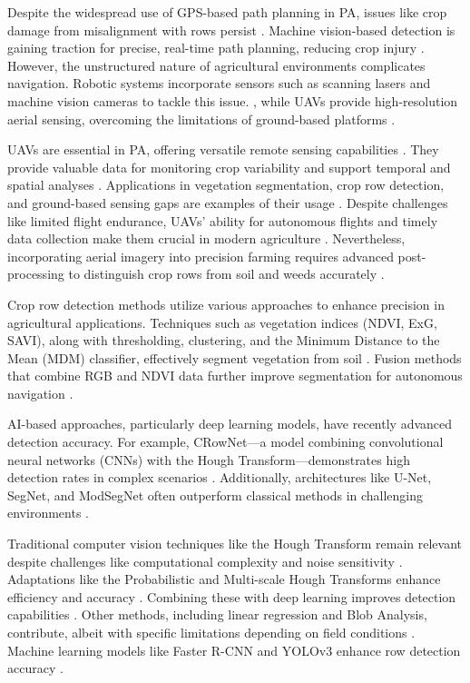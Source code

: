 \documentclass[conference]{IEEEtran}
\begin{document}
	Despite the widespread use of GPS-based path planning in PA, issues like crop damage from misalignment with rows persist \cite{b1}. Machine vision-based detection is gaining traction for precise, real-time path planning, reducing crop injury \cite{b1,b8}. However, the unstructured nature of agricultural environments complicates navigation. Robotic systems incorporate sensors such as scanning lasers and machine vision cameras to tackle this issue. \cite{b2,b3}, while UAVs provide high-resolution aerial sensing, overcoming the limitations of ground-based platforms \cite{b10}.
	
	UAVs are essential in PA, offering versatile remote sensing capabilities \cite{b9,b12}. They provide valuable data for monitoring crop variability and support temporal and spatial analyses \cite{b10,b12}. Applications in vegetation segmentation, crop row detection, and ground-based sensing gaps are examples of their usage \cite{b7,b13}. Despite challenges like limited flight endurance, UAVs' ability for autonomous flights and timely data collection make them crucial in modern agriculture \cite{b11,b13}. Nevertheless, incorporating aerial imagery into precision farming requires advanced post-processing to distinguish crop rows from soil and weeds accurately \cite{b6}.
	
	Crop row detection methods utilize various approaches to enhance precision in agricultural applications. Techniques such as vegetation indices (NDVI, ExG, SAVI), along with thresholding, clustering, and the Minimum Distance to the Mean (MDM) classifier, effectively segment vegetation from soil \cite{b1,b6,b13}. Fusion methods that combine RGB and NDVI data further improve segmentation for autonomous navigation \cite{b5}.
	
	AI-based approaches, particularly deep learning models, have recently advanced detection accuracy. For example, CRowNet—a model combining convolutional neural networks (CNNs) with the Hough Transform—demonstrates high detection rates in complex scenarios \cite{b8,b14}. Additionally, architectures like U-Net, SegNet, and ModSegNet often outperform classical methods in challenging environments \cite{b5,b13}.
	
	Traditional computer vision techniques like the Hough Transform remain relevant despite challenges like computational complexity and noise sensitivity \cite{b2,b15}. Adaptations like the Probabilistic and Multi-scale Hough Transforms enhance efficiency and accuracy \cite{b2}. Combining these with deep learning improves detection capabilities \cite{b8}. Other methods, including linear regression and Blob Analysis, contribute, albeit with specific limitations depending on field conditions \cite{b2,b3}. Machine learning models like Faster R-CNN and YOLOv3 enhance row detection accuracy \cite{b2,b5}.
	
\end{document}
